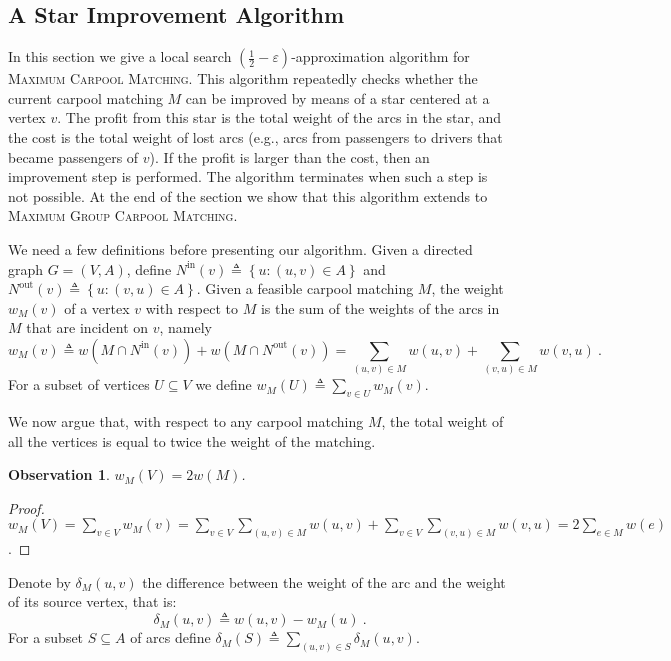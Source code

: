 \documentclass[11pt]{article}
\newtheorem{observation}[lemma]{Observation}
\newcommand{\set}[1]{\left\{ #1 \right\}}
\newcommand{\eqdf}{\triangleq}
\newcommand{\half}{\frac{1}{2}}
\newcommand{\nin}[1][M]{N^{\text{in}}_{#1}}
\newcommand{\nout}[1][M]{N^{\text{out}}_{#1}}
\newcommand{\carpool}{\textsc{Maximum Carpool Matching}\xspace}
\newcommand{\gcp}{\textsc{Maximum Group Carpool Matching}\xspace}
\newcommand{\eps}{\varepsilon}
\begin{document}

\subsection{A Star Improvement Algorithm}
\label{sec:improve}

In this section we give a local search $(\half-\eps)$-approximation
algorithm for \carpool.  This algorithm repeatedly checks whether the
current carpool matching $M$ can be improved by means of a star
centered at a vertex $v$.  The profit from this star is the total
weight of the arcs in the star, and the cost is the total weight of
lost arcs (e.g., arcs from passengers to drivers that became
passengers of $v$).  If the profit is larger than the cost, then an
improvement step is performed.  The algorithm terminates when such a
step is not possible.
%
At the end of the section we show that this algorithm extends to \gcp.


We need a few definitions before presenting our algorithm.
%
Given a directed graph $G = (V,A)$, define $\nin[](v) \eqdf \set{u :
  (u,v) \in A}$ and $\nout[](v) \eqdf \set{u : (v,u) \in A}$.
%
Given a feasible carpool matching $M$, the weight $w_M(v)$ of a vertex
$v$ with respect to $M$ is the sum of the weights of the arcs in $M$
that are incident on $v$, namely
\[
w_M(v)
\eqdf w(M \cap \nin[](v)) + w(M \cap \nout[](v))
=     \sum_{(u, v) \in M} w(u, v) + \sum_{(v, u) \in M} w(v, u)
~.
\]
For a subset of vertices $U \subseteq V$ we define
$w_M(U) \eqdf \sum_{v \in U} w_M(v)$.

We now argue that, with respect to any carpool matching $M$, the total
weight of all the vertices is equal to twice the weight of the matching.

\begin{observation}
\label{lm:val-twice}
$w_M(V) = 2 w(M)$.
\end{observation}
\begin{proof}
\(\displaystyle
w_M(V)
= \sum_{v \in V} w_M(v)
= \sum_{v \in V} \sum_{(u, v) \in M} w(u, v) +
    \sum_{v \in V} \sum_{(v, u) \in M} w(v, u) 
= 2 \sum_{e \in M} w(e)
\).
\end{proof}

Denote by $\delta_M(u,v)$ the difference between the weight of the arc
and the weight of its source vertex, that is:
\[
\delta_M(u, v) \eqdf w(u, v) - w_M(u)
~.
\]
For a subset $S \subseteq A$ of arcs define
$\delta_M(S) \eqdf \sum_{(u,v) \in S} \delta_M(u,v)$.
\end{document}
